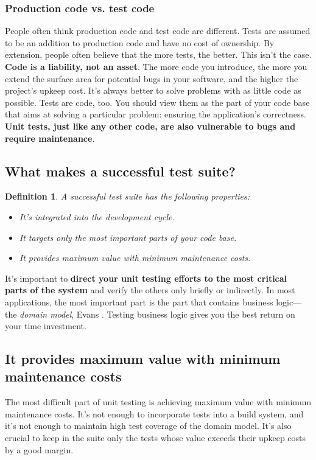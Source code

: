 \documentclass{article}
\newtheorem{definition}{Definition}
\begin{document}
\subsubsection{Production code vs. test code}
People often think production code and test code are different. Tests are assumed to be an addition to production code and have no cost of ownership. By extension, people often believe that the more tests, the better. This isn’t the case. \textbf{Code is a liability, not an asset}. The more code you introduce, the more you extend the surface area for potential bugs in your software, and the higher the project’s upkeep cost. It’s always better to solve problems with as little code as possible. Tests are code, too. You should view them as the part of your code base that aims at solving a particular problem: ensuring the application’s correctness. \textbf{Unit tests, just like any other code, are also vulnerable to bugs and require maintenance}.

\subsection{What makes a successful test suite?}

\begin{definition}
A successful test suite has the following properties:
\begin{itemize}
	\item It’s integrated into the development cycle.
	\item It targets only the most important parts of your code base.
	\item It provides maximum value with minimum maintenance costs.
\end{itemize}
\end{definition}

 It’s important to \textbf{direct your unit testing efforts to the most critical parts of the system} and verify the others only briefly or indirectly. In most applications, the most important part is the part that contains business logic—the \textit{domain model}, Evans \cite{evans2004} .  Testing business logic gives you the best return on your time investment.

\subsection{It provides maximum value with minimum maintenance costs}
The most difficult part of unit testing is achieving maximum value with minimum maintenance costs.
It’s not enough to incorporate tests into a build system, and it’s not enough to maintain high test coverage of the domain model. It’s also crucial to keep in the suite only the tests whose value exceeds their upkeep costs by a good margin.
\end{document}
